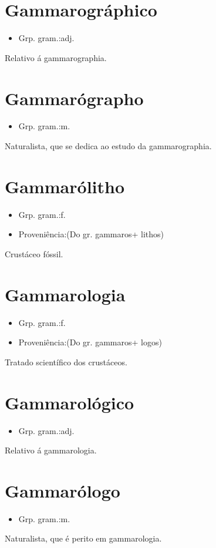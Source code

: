 \section{Gammarográphico}
\begin{itemize}
\item {Grp. gram.:adj.}
\end{itemize}
Relativo á gammarographia.
\section{Gammarógrapho}
\begin{itemize}
\item {Grp. gram.:m.}
\end{itemize}
Naturalista, que se dedica ao estudo da gammarographia.
\section{Gammarólitho}
\begin{itemize}
\item {Grp. gram.:f.}
\end{itemize}
\begin{itemize}
\item {Proveniência:(Do gr. \textunderscore gammaros\textunderscore  + \textunderscore lithos\textunderscore )}
\end{itemize}
Crustáceo fóssil.
\section{Gammarologia}
\begin{itemize}
\item {Grp. gram.:f.}
\end{itemize}
\begin{itemize}
\item {Proveniência:(Do gr. \textunderscore gammaros\textunderscore  + \textunderscore logos\textunderscore )}
\end{itemize}
Tratado scientífico dos crustáceos.
\section{Gammarológico}
\begin{itemize}
\item {Grp. gram.:adj.}
\end{itemize}
Relativo á gammarologia.
\section{Gammarólogo}
\begin{itemize}
\item {Grp. gram.:m.}
\end{itemize}
Naturalista, que é perito em gammarologia.
